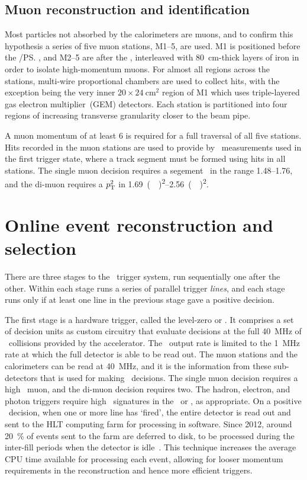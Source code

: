 \subsection{Muon reconstruction and identification}
\label{chap:intro:lhcb:muon}

Most particles not absorbed by the calorimeters are muons, and to confirm this 
hypothesis a series of five muon stations, M1--5, are used.
M1 is positioned before the \spd/\ps, and M2--5 are after the \hcal, 
interleaved with \SI{80}{\centi\metre}-thick layers of iron in order to isolate 
high-momentum muons.
For almost all regions across the stations, multi-wire proportional chambers 
are used to collect hits, with the exception being the very inner 
$20\times\SI{24}{\centi\metre\squared}$ region of M1 which uses triple-layered 
gas electron multiplier~(GEM) detectors.
Each station is partitioned into four regions of increasing transverse 
granularity closer to the beam pipe.

A muon momentum of at least \SI{6}{\GeVc} is required for a full traversal of 
all five stations.
Hits recorded in the muon stations are used to provide by \pT\ measurements 
used in the first trigger state, where a track segment must be formed using 
hits in all stations.
The single muon decision requires a segement \pT\ in the range 
\SIrange{1.48}{1.76}{\GeVc}, and the di-muon requires a $p_{\textnormal{T}}^{2}$ in 
\SIrange{1.69}{2.56}{(\GeVc)\squared}.

\section{Online event reconstruction and selection}
\label{chap:intro:lhcb:trigger}

There are three stages to the \lhcb\ trigger system, run sequentially one after 
the other.
Within each stage runs a series of parallel trigger \emph{lines}, and each 
stage runs only if at least one line in the previous stage gave a positive 
decision.

The first stage is a hardware trigger, called the level-zero or \lzero.
It comprises a set of decision units as custom circuitry that evaluate 
decisions at the full \SI{40}{\mega\hertz} of \pp\ collisions provided by the 
accelerator.
The \lzero\ output rate is limited to the \SI{1}{\mega\hertz} rate at which the 
full detector is able to be read out.
The muon stations and the calorimeters can be read at \SI{40}{\mega\hertz}, and 
it is the information from these sub-detectors that is used for making \lzero\ 
decisions.
The single muon decision requires a high \pT\ muon, and the di-muon decision 
requires two.
The hadron, electron, and photon triggers require high \ET\ signatures in the 
\hcal\ or \ecal, as appropriate.
On a positive \lzero\ decision, when one or more line has `fired', the entire 
detector is read out and sent to the \ac{HLT} computing farm for processing in 
software.
Since 2012, around \SI{20}{\percent} of events sent to the farm are deferred to 
disk, to be processed during the inter-fill periods when the detector is 
idle~\cite{1742-6596-513-1-012006}.
This technique increases the average CPU time available for processing each 
event, allowing for looser momentum requirements in the reconstruction and 
hence more efficient triggers.

